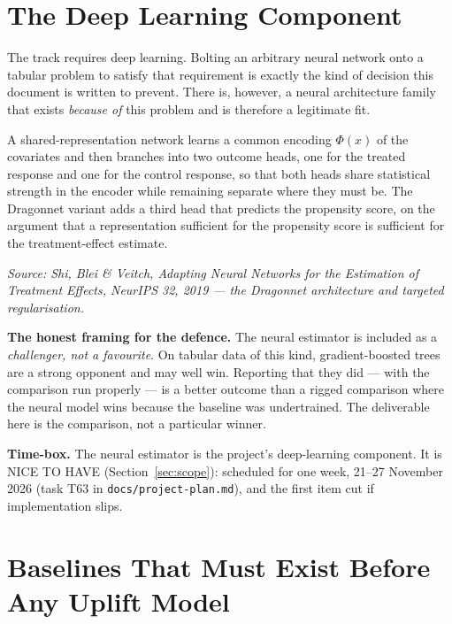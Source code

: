 \documentclass[11pt,a4paper]{article}
\newcommand{\srcnote}[1]{{\footnotesize\itshape\color{teal}Source: #1}}
\begin{document}
\section{The Deep Learning Component}
\label{sec:deep}

The track requires deep learning. Bolting an arbitrary neural network onto a tabular problem to
satisfy that requirement is exactly the kind of decision this document is written to prevent. There
is, however, a neural architecture family that exists \emph{because of} this problem and is
therefore a legitimate fit.

A shared-representation network learns a common encoding $\Phi(x)$ of the covariates and then
branches into two outcome heads, one for the treated response and one for the control response, so
that both heads share statistical strength in the encoder while remaining separate where they must
be. The Dragonnet variant adds a third head that predicts the propensity score, on the argument
that a representation sufficient for the propensity score is sufficient for the treatment-effect
estimate.

\srcnote{Shi, Blei \& Veitch, \emph{Adapting Neural Networks for the Estimation of Treatment
Effects}, NeurIPS 32, 2019 --- the Dragonnet architecture and targeted regularisation.}

\begin{keybox}
\textbf{The honest framing for the defence.} The neural estimator is included as a \emph{challenger,
not a favourite}. On tabular data of this kind, gradient-boosted trees are a strong opponent and may
well win. Reporting that they did --- with the comparison run properly --- is a better outcome than
a rigged comparison where the neural model wins because the baseline was undertrained. The
deliverable here is the comparison, not a particular winner.
\end{keybox}

\textbf{Time-box.} The neural estimator is the project's deep-learning component. It is NICE TO
HAVE (Section~\ref{sec:scope}): scheduled for one week, 21--27 November 2026 (task T63 in
\texttt{docs/project-plan.md}), and the first item cut if implementation slips.

\section{Baselines That Must Exist Before Any Uplift Model}
\label{sec:baselines}
\end{document}
